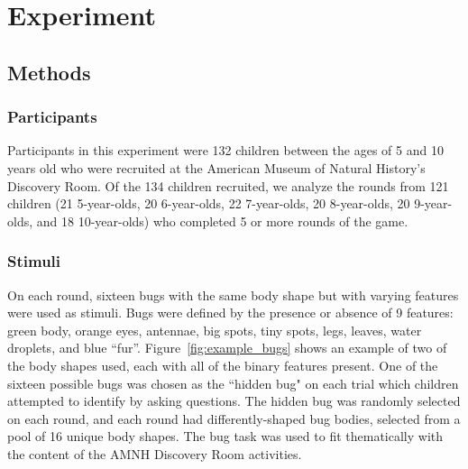 \documentclass[10pt,letterpaper]{article}
\begin{document}
\section{Experiment}
\vspace{-.2cm}

\subsection{Methods}
\vspace{-.1cm}
\subsubsection{Participants}

Participants in this experiment were 132 children between the ages of 5 and 10 
years old who were recruited at the American Museum of Natural History's 
Discovery Room. Of the 134 children recruited, we analyze the rounds from 121 
children (21 5-year-olds, 20 6-year-olds, 22 7-year-olds, 20 8-year-olds, 20 9-year-olds, 
and 18 10-year-olds) who completed 5 or more rounds of the game.

\subsubsection{Stimuli}

On each round, sixteen bugs with the same body shape but with varying features were used as stimuli. Bugs were defined by the presence or absence of 9 features: green body, 
orange eyes, antennae, big spots, tiny spots, legs, leaves, water droplets, and blue 
``fur''. Figure~\ref{fig:example_bugs} shows an example of two of the body shapes used, each with all of the binary features present. One of the sixteen possible bugs was chosen as the ``hidden bug" on each trial which 
children attempted to identify by asking questions. The hidden bug was 
randomly selected on each round, and each round had differently-shaped bug 
bodies, selected from a pool of 16 unique body shapes.  The bug task was used to fit thematically with the content of the AMNH Discovery Room activities.
\end{document}
